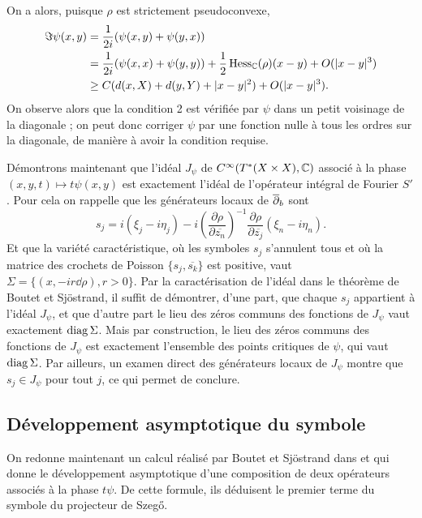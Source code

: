 On a alors, puisque $\rho$ est strictement pseudoconvexe,
\begin{align*}
	\Im \psi (x,y) &= \frac{1}{2i}(\psi(x,y)+\psi(y,x)) \\
	&= \frac{1}{2i}(\psi(x,x)+\psi(y,y)) + \frac{1}{2}\operatorname{Hess}_{\mathbb{C}}(\rho)(x-y)+O(|x-y|^3)\\
	&\geq C(d(x,X)+d(y,Y) + |x-y|^2) + O(|x-y|^3).
\end{align*}
On observe alors que la condition 2 est vérifiée par $\psi$ dans un
petit voisinage de la diagonale ; on peut donc corriger $\psi$ par une fonction nulle à tous les ordres sur la diagonale, de manière à avoir la condition requise.

Démontrons maintenant que l'idéal $J_{\psi}$ de $C^{\infty}(T^*(X\times X), \mathbb{C})$ associé à la phase$(x,y,t)\mapsto t\psi(x,y)$ est exactement l'idéal de l'opérateur intégral de Fourier $S'$. Pour cela on rappelle que les générateurs locaux de $\overline{\partial}_b$ sont
\begin{equation*}
s_j = i(\xi_j - i \eta_j) - i\left(\frac{\partial \rho}{\partial \overline{z_n}}\right)^{-1}\frac{\partial \rho}{\partial \overline{z_j}}(\xi_n - i \eta_n).
\end{equation*}
Et que la variété caractéristique, où les symboles $s_j$ s'annulent tous et où la matrice des crochets de Poisson $\{s_j,\overline{s_k} \}$ est positive, vaut $\Sigma=\{(x,-ir\dd \rho), r>0\}$. Par la caractérisation de l'idéal dans le théorème de Boutet et Sjöstrand, il suffit de démontrer, d'une part, que chaque $s_j$ appartient à l'idéal $J_{\psi}$, et que d'autre part le lieu des zéros communs des fonctions de $J_{\psi}$ vaut exactement $\operatorname{diag} \Sigma$. Mais par construction, le lieu des zéros communs des fonctions de $J_{\psi}$ est exactement l'ensemble des points critiques de $\psi$, qui vaut $\operatorname{diag} \Sigma$. Par ailleurs, un examen direct des générateurs locaux de $J_{\psi}$ montre que $s_j \in J_{\psi}$ pour tout $j$, ce qui permet de conclure.

\subsection{Développement asymptotique du symbole}
On redonne maintenant un calcul réalisé par Boutet et Sjöstrand dans
\cite{BoutetdeMonvel1975} et qui donne le développement asymptotique
d'une composition de deux opérateurs associés à la phase $t\psi$. De
cette formule, ils déduisent le premier terme du symbole du projecteur
de Szeg\H{o}.


